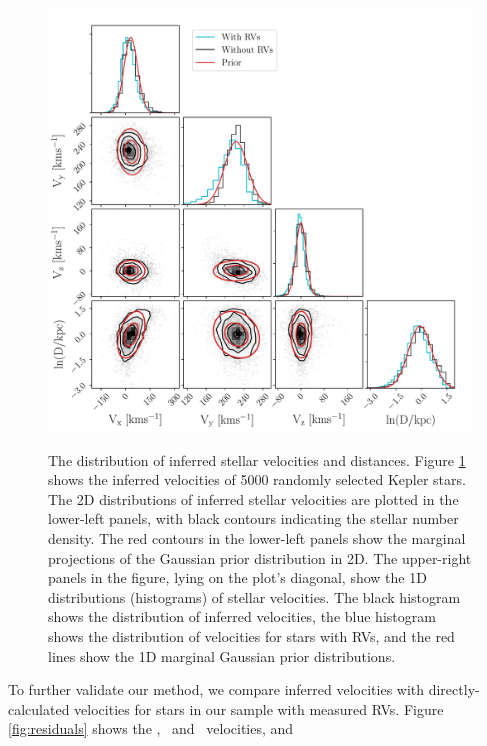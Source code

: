
\begin{figure}[ht!]
\caption{
The distribution of inferred stellar velocities and distances.
    Figure \ref{fig:results} shows the inferred velocities of 5000 randomly
selected Kepler stars.
The 2D distributions of inferred stellar velocities are plotted in the
lower-left panels, with black contours indicating the stellar number density.
The red contours in the lower-left panels show the marginal projections of
    the Gaussian prior distribution in 2D.
The upper-right panels in the figure, lying on the plot's diagonal, show the
    1D distributions (histograms) of stellar velocities.
The black histogram shows the distribution of inferred velocities, the blue
histogram shows the distribution of velocities for stars with RVs,
and the red lines show the 1D marginal Gaussian prior distributions.
}
  \centering
    \includegraphics[width=.7\textwidth]{results}
\label{fig:results}
\end{figure}
To further validate our method, we compare inferred velocities with
directly-calculated velocities for stars in our sample with measured RVs.
Figure \ref{fig:residuals} shows the \vx, \vy\ and \vz\ velocities, and
